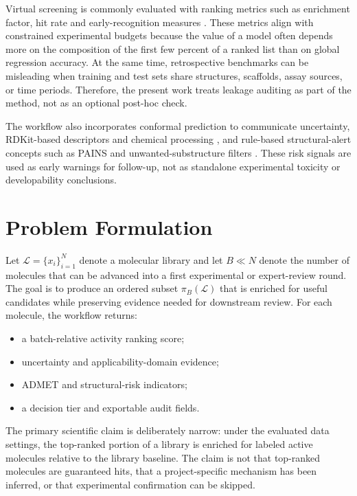 \documentclass[manuscript=article]{achemso}
\begin{document}
Virtual screening is commonly evaluated with ranking metrics such as
enrichment factor, hit rate and early-recognition measures
\cite{truchon_bedroc}. These metrics align with constrained experimental
budgets because the value of a model often depends more on the composition of
the first few percent of a ranked list than on global regression accuracy.
At the same time, retrospective benchmarks can be misleading when training and
test sets share structures, scaffolds, assay sources, or time periods.
Therefore, the present work treats leakage auditing as part of the method, not
as an optional post-hoc check.

The workflow also incorporates conformal prediction \cite{vovk_conformal} to
communicate uncertainty, RDKit-based descriptors and chemical processing
\cite{rdkit}, and rule-based structural-alert concepts such as PAINS
\cite{pains} and unwanted-substructure filters \cite{brenk}. These risk signals
are used as early warnings for follow-up, not as standalone experimental
toxicity or developability conclusions.

\section{Problem Formulation}
Let $\mathcal{L}=\{x_i\}_{i=1}^{N}$ denote a molecular library and let
$B \ll N$ denote the number of molecules that can be advanced into a first
experimental or expert-review round. The goal is to produce an ordered subset
$\pi_B(\mathcal{L})$ that is enriched for useful candidates while preserving
evidence needed for downstream review. For each molecule, the workflow returns:
\begin{itemize}
  \item a batch-relative activity ranking score;
  \item uncertainty and applicability-domain evidence;
  \item ADMET and structural-risk indicators;
  \item a decision tier and exportable audit fields.
\end{itemize}

The primary scientific claim is deliberately narrow: under the evaluated data
settings, the top-ranked portion of a library is enriched for labeled active
molecules relative to the library baseline. The claim is not that top-ranked
molecules are guaranteed hits, that a project-specific mechanism has been
inferred, or that experimental confirmation can be skipped.
\end{document}
